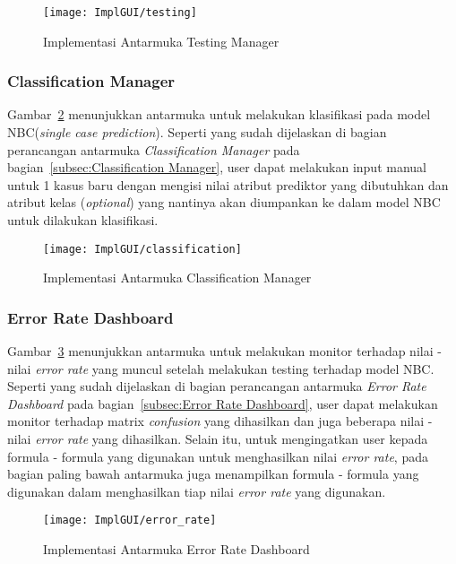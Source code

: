 \begin{figure}[H]
	\centering
	\texttt{[image: ImplGUI/testing]}
	\caption[Implementasi Antarmuka Testing Manager]{Implementasi Antarmuka Testing Manager}
	\label{fig:Implementasi Antarmuka Testing Manager}
\end{figure}

\subsubsection{Classification Manager}
Gambar~\ref{fig:Implementasi Antarmuka Classification Manager} menunjukkan antarmuka untuk melakukan klasifikasi pada model NBC(\textit{single case prediction}). Seperti yang sudah dijelaskan di bagian perancangan antarmuka \textit{Classification Manager} pada bagian~\ref{subsec:Classification Manager}, user dapat melakukan input manual untuk 1 kasus baru dengan mengisi nilai atribut prediktor yang dibutuhkan dan atribut kelas (\textit{optional}) yang nantinya akan diumpankan ke dalam model NBC untuk dilakukan klasifikasi.

\begin{figure}[H]
	\centering
	\texttt{[image: ImplGUI/classification]}
	\caption[Implementasi Antarmuka Classification Manager]{Implementasi Antarmuka Classification Manager}
	\label{fig:Implementasi Antarmuka Classification Manager}
\end{figure}

\subsubsection{Error Rate Dashboard}
Gambar~\ref{fig:Implementasi Antarmuka Error Rate Dashboard} menunjukkan antarmuka untuk melakukan monitor terhadap nilai - nilai \textit{error rate} yang muncul setelah melakukan testing terhadap model NBC. Seperti yang sudah dijelaskan di bagian perancangan antarmuka \textit{Error Rate Dashboard} pada bagian~\ref{subsec:Error Rate Dashboard}, user dapat melakukan monitor terhadap matrix \textit{confusion} yang dihasilkan dan juga beberapa nilai - nilai \textit{error rate} yang dihasilkan. Selain itu, untuk mengingatkan user kepada formula - formula yang digunakan untuk menghasilkan nilai \textit{error rate}, pada bagian paling bawah antarmuka juga menampilkan formula - formula yang digunakan dalam menghasilkan tiap nilai \textit{error rate} yang digunakan. 

\begin{figure}[H]
	\centering
	\texttt{[image: ImplGUI/error\_rate]}
	\caption[Implementasi Antarmuka Error Rate Dashboard]{Implementasi Antarmuka Error Rate Dashboard}
	\label{fig:Implementasi Antarmuka Error Rate Dashboard}
\end{figure}

